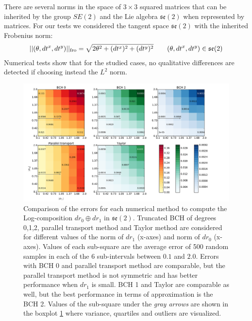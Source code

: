 There are several norms in the space of $3\times 3$ squared matrices that can be inherited by the group $SE(2)$ and the Lie algebra $\mathfrak{se}(2)$ when represented by matrices. For our tests we considered the tangent space $\mathfrak{se}(2)$ with the inherited Frobenius norm:
\begin{align*}
\vert\lvert (\theta,dt^{x},dt^{y}) \rvert\vert_{\text{fro}} = \sqrt{2\theta^{2} + (dt^{x})^2 + (dt^{y})^2} 
\qquad
(\theta,dt^{x},dt^{y}) \in \mathfrak{se}(2)
\end{align*}
Numerical tests show that for the studied cases, no qualitative differences are detected if choosing instead the $L^{2}$ norm.
 \begin{figure}[!ht]
 	\hspace{-1.3cm}
 	\includegraphics[scale=0.50]{figures/se2_image_scale.pdf}
 	\caption{Comparison of the errors for each numerical method to compute the Log-composition $dr_{0} \oplus dr_{1}$ in $\mathfrak{se}(2)$. Truncated BCH of degrees 0,1,2, parallel transport method and Taylor method are considered for different values of the norm of $dr_{1}$ (x-axes) and norm of $dr_{0}$ (x-axes). 
 	Values of each sub-square are the average error of 500 random samples in each of the 6 sub-intervals between $0.1$ and $2.0$. Errors with BCH 0 and parallel transport method are comparable, but the parallel transport method is not symmetric and has better performance when $dr_{1}$ is small. BCH 1 and Taylor are comparable as well, but the best performance in terms of approximation is the BCH 2. Values of the sub-square under the \emph{gray arrows} are shown in the boxplot \ref{fig:se2_image_scale} where variance, quartiles and outliers are visualized.
 	 }
 	\label{fig:se2_image_scale}
 \end{figure}
